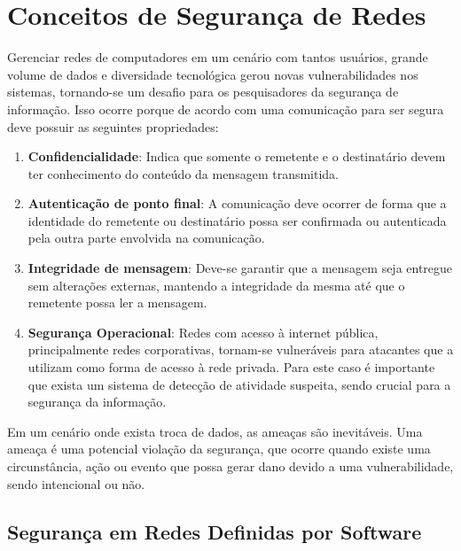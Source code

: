 




\section{Conceitos de Segurança de Redes}

\par Gerenciar redes de computadores em um cenário com tantos usuários, grande volume de dados e diversidade tecnológica gerou novas vulnerabilidades nos sistemas, tornando-se um desafio para os pesquisadores da segurança de informação. Isso ocorre porque de acordo com  uma comunicação para ser segura deve possuir as seguintes propriedades:

\begin{enumerate}
    \item \textbf{Confidencialidade}:  Indica que somente o remetente e o destinatário devem ter conhecimento do conteúdo da mensagem transmitida.
    
    \item \textbf{Autenticação de ponto final}: A comunicação deve ocorrer de forma que a identidade do remetente ou destinatário possa ser confirmada ou autenticada pela outra parte envolvida na comunicação.
    
    \item \textbf{Integridade de mensagem}: Deve-se garantir que a mensagem seja entregue sem alterações externas, mantendo a integridade da mesma até que o remetente possa ler a mensagem.
    
    \item \textbf{Segurança Operacional}: Redes com acesso à internet pública, principalmente redes corporativas, tornam-se vulneráveis para atacantes que a utilizam como forma de acesso à rede privada. Para este caso é importante que exista um sistema de detecção de atividade suspeita, sendo crucial para a segurança da informação.
    
\end{enumerate}

 Em um cenário onde exista troca de dados, as ameaças são inevitáveis. Uma ameaça é uma potencial violação da segurança, que ocorre quando existe uma circunstância, ação ou evento que possa gerar dano devido a uma vulnerabilidade, sendo intencional ou não.\cite{rfc2828}
 
 
 
\subsection{Segurança em Redes Definidas por Software}

